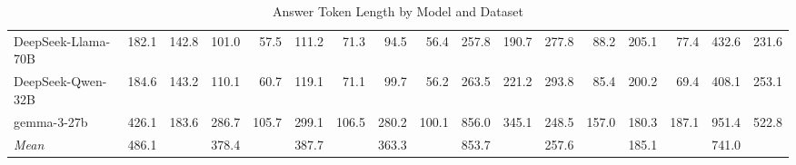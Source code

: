 \begin{table}[ht]
{\begin{tabular}{l r r r r r r r r r r r r r r r r}
      DeepSeek-Llama-70B & 182.1 & 142.8 & 101.0 & 57.5 & 111.2 & 71.3 & 94.5 & 56.4 & 257.8 & 190.7 & 277.8 & 88.2 & 205.1 & 77.4 & 432.6 & 231.6 \\
      DeepSeek-Qwen-32B & 184.6 & 143.2 & 110.1 & 60.7 & 119.1 & 71.1 & 99.7 & 56.2 & 263.5 & 221.2 & 293.8 & 85.4 & 200.2 & 69.4 & 408.1 & 253.1 \\
      gemma-3-27b & 426.1 & 183.6 & 286.7 & 105.7 & 299.1 & 106.5 & 280.2 & 100.1 & 856.0 & 345.1 & 248.5 & 157.0 & 180.3 & 187.1 & 951.4 & 522.8 \\
      \midrule
      \textit{Mean} & 486.1 &  & 378.4 &  & 387.7 &  & 363.3 &  & 853.7 &  & 257.6 &  & 185.1 &  & 741.0 &  \\
      \bottomrule
    \end{tabular}%
  }
  \caption{Answer Token Length by Model and Dataset}
\end{table}
